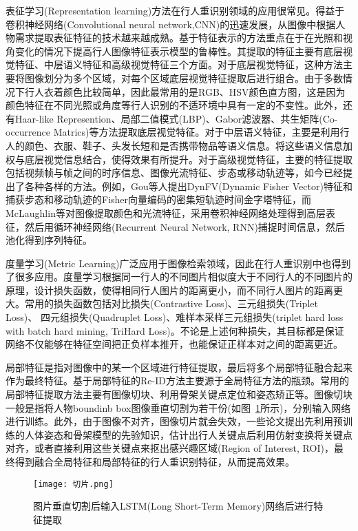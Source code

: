 表征学习(Representation learning)方法在行人重识别领域的应用很常见。得益于卷积神经网络(Convolutional neural network,CNN)的迅速发展，从图像中根据人物需求提取表征特征的技术越来越成熟。基于特征表示的方法重点在于在光照和视角变化的情况下提高行人图像特征表示模型的鲁棒性。其提取的特征主要有底层视觉特征、中层语义特征和高级视觉特征三个方面。对于底层视觉特征，这种方法主要将图像划分为多个区域，对每个区域底层视觉特征提取后进行组合。由于多数情况下行人衣着颜色比较简单，因此最常用的是RGB、HSV颜色直方图，这是因为颜色特征在不同光照或角度等行人识别的不适环境中具有一定的不变性。此外，还有Haar-like Represention、局部二值模式(LBP)、Gabor滤波器、共生矩阵(Co-occurrence Matrics)等方法提取底层视觉特征。对于中层语义特征，主要是利用行人的颜色、衣服、鞋子、头发长短和是否携带物品等语义信息。将这些语义信息加权与底层视觉信息结合，使得效果有所提升。对于高级视觉特征，主要的特征提取包括视频帧与帧之间的时序信息、图像光流特征、步态或移动轨迹等，如今已经提出了各种各样的方法。例如，Gou\cite{gou2016person}等人提出DynFV(Dynamic Fisher Vector)特征和捕获步态和移动轨迹的Fisher向量编码的密集短轨迹时间金字塔特征，而McLaughlin\cite{mclaughlin2016recurrent}等对图像提取颜色和光流特征，采用卷积神经网络处理得到高层表征，然后用循环神经网络(Recurrent Neural Network, RNN)捕捉时间信息，然后池化得到序列特征。

度量学习(Metric Learning)广泛应用于图像检索领域，因此在行人重识别中也得到了很多应用。度量学习根据同一行人的不同图片相似度大于不同行人的不同图片的原理，设计损失函数，使得相同行人图片的距离更小，而不同行人图片的距离更大。常用的损失函数包括对比损失(Contrastive Loss)、三元组损失(Triplet Loss)、 四元组损失(Quadruplet Loss)、难样本采样三元组损失(triplet hard loss with batch hard mining, TriHard Loss)。不论是上述何种损失，其目标都是保证网络不仅能够在特征空间把正负样本推开，也能保证正样本对之间的距离更近。

局部特征是指对图像中的某一个区域进行特征提取，最后将多个局部特征融合起来作为最终特征。基于局部特征的Re-ID方法主要源于全局特征方法的瓶颈。常用的局部特征提取方法主要有图像切块、利用骨架关键点定位和姿态矫正等。图像切块一般是指将人物boundinb box图像垂直切割为若干份(如图~\ref{fig:part}所示\cite{varior2016siamese})，分别输入网络进行训练。此外，由于图像不对齐，图像切片就会失效，一些论文提出先利用预训练的人体姿态和骨架模型的先验知识，估计出行人关键点后利用仿射变换将关键点对齐，或者直接利用这些关键点来抠出感兴趣区域(Region of Interest, ROI)\cite{zhao2017spindle}，最终得到融合全局特征和局部特征的行人重识别特征，从而提高效果。

\begin{figure}
  \centering
  \texttt{[image: 切片.png]}
  \caption{图片垂直切割后输入LSTM(Long Short-Term Memory)网络后进行特征提取}
  \label{fig:part}
\end{figure}

